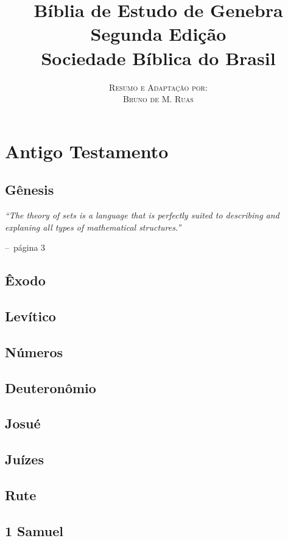 \documentclass[a4paper,11pt,oneside]{book}
\title{\Huge \textbf{Bíblia de Estudo de Genebra} \\ 
\Large Segunda Edição \\
\huge Sociedade Bíblica do Brasil}
\author{
\textsc{Resumo e Adaptação por:} \\
\textsc{Bruno de M. Ruas}
}
\makeatletter
\theoremstyle{definition}
\theoremstyle{break}
\newenvironment{chapquote}[2][2em]
  {\setlength{\@tempdima}{#1}%
   \def\chapquote@author{#2}%
   \parshape 1 \@tempdima \dimexpr\textwidth-2\@tempdima\relax%
   \itshape}
  {\par\normalfont\hfill--\ \chapquote@author\hspace*{\@tempdima}\par\bigskip}
\makeatother
\begin{document}
\frontmatter
\maketitle

\tableofcontents

\mainmatter


\part{Antigo Testamento}

\chapter{Gênesis}

\begin{chapquote}{página 3}
	``The theory of sets is a language that is perfectly suited to describing and explaning all types of mathematical structures.''
\end{chapquote}

\chapter{Êxodo}
\chapter{Levítico}
\chapter{Números}
\chapter{Deuteronômio}
\chapter{Josué}
\chapter{Juízes}
\chapter{Rute}
\chapter{1 Samuel}
\end{document}
